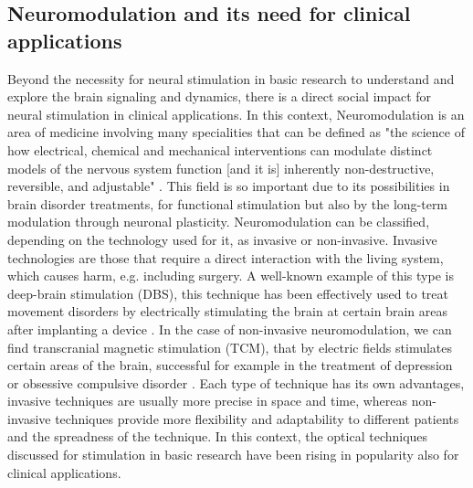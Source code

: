 \subsection{Neuromodulation and its need for clinical applications}


Beyond the necessity for neural stimulation in basic research to understand and explore the brain signaling and dynamics, there is a direct social impact for neural stimulation in clinical applications. In this context, Neuromodulation is an area of medicine involving many specialities that can be defined as "the science of how electrical, chemical and mechanical interventions can modulate distinct models of the nervous system function [and it is] inherently non-destructive, reversible, and adjustable" \parencite{krames_neuromodulation_2009}. This field is so important due to its possibilities in brain disorder treatments, for functional stimulation but also by the long-term modulation through neuronal plasticity. Neuromodulation can be classified, depending on the technology used for it, as invasive or non-invasive. Invasive technologies are those that require a direct interaction with the living system, which causes harm, e.g. including surgery. A well-known example of this type is deep-brain stimulation (DBS), this technique has been effectively used to treat movement disorders by electrically stimulating the brain at certain brain areas after implanting a device \parencite{limousin_long-term_2019, hariz_deep_2022}. In the case of non-invasive neuromodulation, we can find transcranial magnetic stimulation (TCM), that by electric fields stimulates certain areas of the brain, successful for example in the treatment of depression or obsessive compulsive disorder \parencite{valero-cabre_transcranial_2017, clarke_patients_2018}. Each type of technique has its own advantages, invasive techniques are usually more precise in space and time, whereas non-invasive techniques provide more flexibility and adaptability to different patients and the spreadness of the technique. In this context, the optical techniques discussed for stimulation in basic research have been rising in popularity also for clinical applications. 












